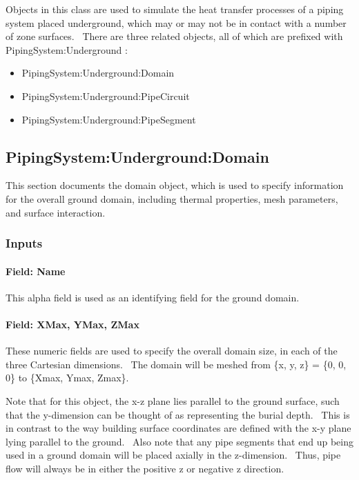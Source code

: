 Objects in this class are used to simulate the heat transfer processes of a piping system placed underground, which may or may not be in contact with a number of zone surfaces.~ There are three related objects, all of which are prefixed with PipingSystem:Underground :

\begin{itemize}
\item
  PipingSystem:Underground:Domain
\item
  PipingSystem:Underground:PipeCircuit
\item
  PipingSystem:Underground:PipeSegment
\end{itemize}

\subsection{PipingSystem:Underground:Domain}\label{pipingsystemundergrounddomain}

This section documents the domain object, which is used to specify information for the overall ground domain, including thermal properties, mesh parameters, and surface interaction.

\subsubsection{Inputs}\label{inputs-9-011}

\paragraph{Field: Name}\label{field-name-9-010}

This alpha field is used as an identifying field for the ground domain.

\paragraph{Field: XMax, YMax, ZMax}\label{field-xmax-ymax-zmax}

These numeric fields are used to specify the overall domain size, in each of the three Cartesian dimensions.~ The domain will be meshed from \{x, y, z\} = \{0, 0, 0\} to \{Xmax, Ymax, Zmax\}.

Note that for this object, the x-z plane lies parallel to the ground surface, such that the y-dimension can be thought of as representing the burial depth.~ This is in contrast to the way building surface coordinates are defined with the x-y plane lying parallel to the ground.~ Also note that any pipe segments that end up being used in a ground domain will be placed axially in the z-dimension.~ Thus, pipe flow will always be in either the positive z or negative z direction.

